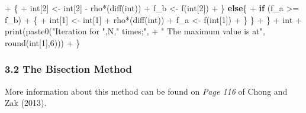 \documentclass[
]{article}
\newenvironment{Shaded}{\begin{snugshade}}{\end{snugshade}}
\newcommand{\ControlFlowTok}[1]{\textcolor[rgb]{0.13,0.29,0.53}{\textbf{#1}}}
\newcommand{\DecValTok}[1]{\textcolor[rgb]{0.00,0.00,0.81}{#1}}
\newcommand{\FunctionTok}[1]{\textcolor[rgb]{0.00,0.00,0.00}{#1}}
\newcommand{\NormalTok}[1]{#1}
\newcommand{\OtherTok}[1]{\textcolor[rgb]{0.56,0.35,0.01}{#1}}
\newcommand{\SpecialCharTok}[1]{\textcolor[rgb]{0.00,0.00,0.00}{#1}}
\newcommand{\StringTok}[1]{\textcolor[rgb]{0.31,0.60,0.02}{#1}}
\begin{document}
\begin{Shaded}
\begin{Highlighting}[]
\SpecialCharTok{+}\NormalTok{     \{}
\SpecialCharTok{+}\NormalTok{       int[}\DecValTok{2}\NormalTok{] }\OtherTok{\textless{}{-}}\NormalTok{ int[}\DecValTok{2}\NormalTok{] }\SpecialCharTok{{-}}\NormalTok{ rho}\SpecialCharTok{*}\NormalTok{(}\FunctionTok{diff}\NormalTok{(int))}
\SpecialCharTok{+}\NormalTok{       f\_b }\OtherTok{\textless{}{-}} \FunctionTok{f}\NormalTok{(int[}\DecValTok{2}\NormalTok{])}
\SpecialCharTok{+}\NormalTok{     \} }\ControlFlowTok{else}\NormalTok{\{}
\SpecialCharTok{+}       \ControlFlowTok{if}\NormalTok{ (f\_a }\SpecialCharTok{\textgreater{}=}\NormalTok{ f\_b)}
\SpecialCharTok{+}\NormalTok{       \{}
\SpecialCharTok{+}\NormalTok{         int[}\DecValTok{1}\NormalTok{] }\OtherTok{\textless{}{-}}\NormalTok{ int[}\DecValTok{1}\NormalTok{] }\SpecialCharTok{+}\NormalTok{ rho}\SpecialCharTok{*}\NormalTok{(}\FunctionTok{diff}\NormalTok{(int))}
\SpecialCharTok{+}\NormalTok{         f\_a }\OtherTok{\textless{}{-}} \FunctionTok{f}\NormalTok{(int[}\DecValTok{1}\NormalTok{])}
\SpecialCharTok{+}\NormalTok{       \} \}}
\SpecialCharTok{+}\NormalTok{   \}}
\SpecialCharTok{+}\NormalTok{   int}
\SpecialCharTok{+}   \FunctionTok{print}\NormalTok{(}\FunctionTok{paste0}\NormalTok{(}\StringTok{"Iteration for "}\NormalTok{,N,}\StringTok{" times;"}\NormalTok{,}
\SpecialCharTok{+}                \StringTok{" The maximum value is at"}\NormalTok{, }\FunctionTok{round}\NormalTok{(int[}\DecValTok{1}\NormalTok{],}\DecValTok{6}\NormalTok{)))}
\SpecialCharTok{+}\NormalTok{ \}}
\end{Highlighting}
\end{Shaded}

\hypertarget{the-bisection-method}{%
\subsubsection{3.2 The Bisection Method}\label{the-bisection-method}}

More information about this method can be found on \emph{Page 116} of
Chong and Zak (2013).
\end{document}

